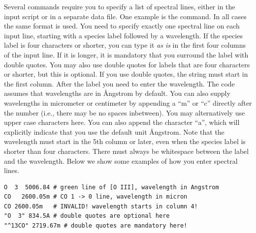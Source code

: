 Several commands require you to specify a list of spectral lines, either in
the input script or in a separate data file. One example is the  command. In all cases the same format is used. You need to
specify exactly one spectral line on each input line, starting with a species
label followed by a wavelength. If the species label is four characters or
shorter, you can type it {\it as is} in the first four columns of the input
line. If it is longer, it is mandatory that you surround the label with double
quotes. You may also use double quotes for labels that are four characters or
shorter, but this is optional. If you use double quotes, the string must start
in the first column. After the label you need to enter the wavelength. The
code assumes that wavelengths are in \AA ngstrom by default. You can also
supply wavelengths in micrometer or centimeter by appending a ``m'' or ``c''
directly after the number (i.e., there may be no spaces inbetween). You may
alternatively use upper case characters here. You can also append the character
``a'', which will explicitly indicate that you use the default unit \AA ngstrom.
Note that the wavelength must start in the 5th column or later, even when the species
label is shorter than four characters. There must always be whitespace between the
label and the wavelength. Below we show some examples of how you enter spectral lines.
\begin{verbatim}
O  3  5006.84 # green line of [O III], wavelength in Angstrom
CO   2600.05m # CO 1 -> 0 line, wavelength in micron
CO 2600.05m   # INVALID! wavelength starts in column 4!
"O  3" 834.5A # double quotes are optional here
"^13CO" 2719.67m # double quotes are mandatory here!
\end{verbatim}

